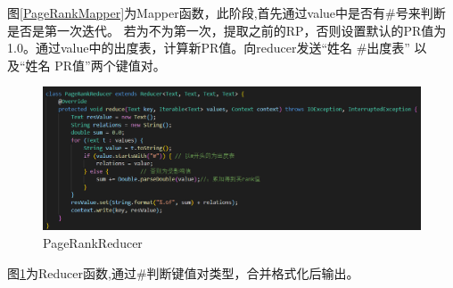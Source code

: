 \documentclass[a4paper,UTF8]{article}
\numberwithin{equation}{section}
\begin{document}
图\ref{PageRankMapper}为Mapper函数，此阶段,首先通过value中是否有\#号来判断是否是第一次迭代。
若为不为第一次，提取之前的RP，否则设置默认的PR值为1.0。通过value中的出度表，计算新PR值。向reducer发送“姓名 \#出度表”
以及“姓名 PR值”两个键值对。\\
\begin{figure}[H]
    \centering
    \includegraphics[width = 15cm]{PageRankReducer.png}
    \caption{PageRankReducer}
    \label{PageRankReducer}
\end{figure}
图\ref{PageRankReducer}为Reducer函数,通过\#判断键值对类型，合并格式化后输出。\\\\
\end{document}
